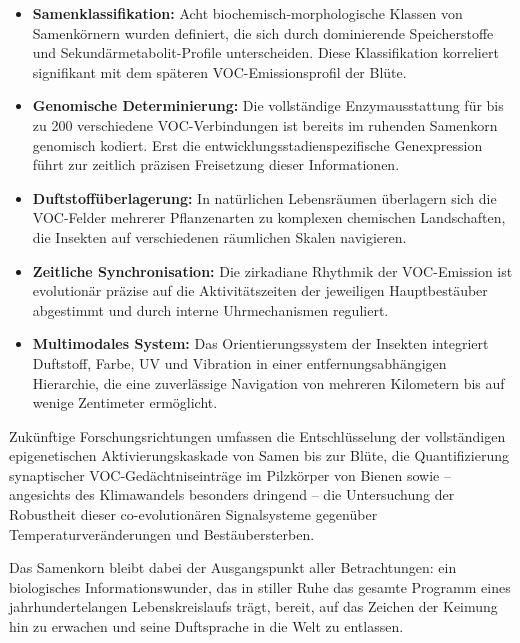 \documentclass[12pt,a4paper]{article}
\begin{document}
\begin{itemize}
  \item \textbf{Samenklassifikation:} Acht biochemisch-morphologische Klassen von Samenk\"ornern wurden definiert, die sich durch dominierende Speicherstoffe und Sekund\"armetabolit-Profile unterscheiden. Diese Klassifikation korreliert signifikant mit dem sp\"ateren VOC-Emissionsprofil der Bl\"ute.
  \item \textbf{Genomische Determinierung:} Die vollst\"andige Enzymausstattung f\"ur bis zu 200 verschiedene VOC-Verbindungen ist bereits im ruhenden Samenkorn genomisch kodiert. Erst die entwicklungsstadienspezifische Genexpression f\"uhrt zur zeitlich pr\"azisen Freisetzung dieser Informationen.
  \item \textbf{Duftstoff\"uberlagerung:} In nat\"urlichen Lebensr\"aumen \"uberlagern sich die VOC-Felder mehrerer Pflanzenarten zu komplexen chemischen Landschaften, die Insekten auf verschiedenen r\"aumlichen Skalen navigieren.
  \item \textbf{Zeitliche Synchronisation:} Die zirkadiane Rhythmik der VOC-Emission ist evolution\"ar pr\"azise auf die Aktivit\"atszeiten der jeweiligen Hauptbest\"auber abgestimmt und durch interne Uhrmechanismen reguliert.
  \item \textbf{Multimodales System:} Das Orientierungssystem der Insekten integriert Duftstoff, Farbe, UV und Vibration in einer entfernungsabh\"angigen Hierarchie, die eine zuverl\"assige Navigation von mehreren Kilometern bis auf wenige Zentimeter erm\"oglicht.
\end{itemize}

Zuk\"unftige Forschungsrichtungen umfassen die Entschl\"usselung der vollst\"andigen epigenetischen Aktivierungskaskade von Samen bis zur Bl\"ute, die Quantifizierung synaptischer VOC-Ged\"achtniseintr\"age im Pilzk\"orper von Bienen sowie -- angesichts des Klimawandels besonders dringend -- die Untersuchung der Robustheit dieser co-evolution\"aren Signalsysteme gegen\"uber Temperaturver\"anderungen und Best\"aubersterben.

Das Samenkorn bleibt dabei der Ausgangspunkt aller Betrachtungen: ein biologisches Informationswunder, das in stiller Ruhe das gesamte Programm eines jahrhundertelangen Lebenskreislaufs tr\"agt, bereit, auf das Zeichen der Keimung hin zu erwachen und seine Duftsprache in die Welt zu entlassen.
\end{document}
